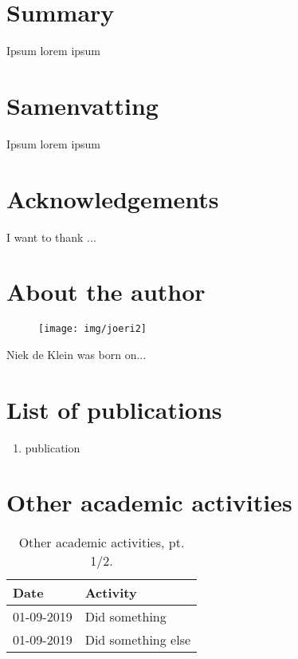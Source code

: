 \begin{appendices}

\chapter{Summary}
Ipsum lorem ipsum

\chapter{Samenvatting}
Ipsum lorem ipsum

\chapter{Acknowledgements}

\newpage
I want to thank ...


\chapter{About the author}

\begin{wrapfigure}{r}{0.33\textwidth}
  \begin{center}
    \texttt{[image: img/joeri2]}
  \end{center}
\end{wrapfigure}
Niek de Klein was born on...

\chapter{List of publications}

\begin{enumerate}
\item publication
\end{enumerate}

\chapter{Other academic activities}

\begin{table}
\footnotesize
\begin{tabulary}{\linewidth}{LL}
  Date & Activity \\
  \hline
  \rule{0pt}{2.5ex}\mbox{01-09-2019} & Did something \\
  \rule{0pt}{2.5ex}\mbox{01-09-2019} & Did something else \\
  \hline
\end{tabulary}
\caption[Other academic activities, pt. 1/2]{Other academic activities, pt. 1/2.}
\label{table:appendix_activities_1}
\end{table}


\end{appendices}
